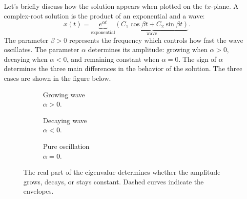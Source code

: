\documentclass[10pt,letterpaper]{article}
\begin{document}
Let's briefly discuss how the solution appears when plotted on the $tx$-plane.
A complex-root solution is the product of an exponential and a wave:
\[
x(t)=
\underbrace{e^{\alpha t}}_{\text{exponential}}
\underbrace{(C_1\cos\beta t+C_2\sin\beta t)}_{\text{wave}}.
\]
The parameter $\beta>0$ represents the frequency which controls how fast the wave oscillates.
The parameter $\alpha$ determines its amplitude: growing when
$\alpha>0$, decaying when $\alpha<0$, and remaining constant when $\alpha=0$. The sign of $\alpha$ determines the three main differences in the behavior of the solution. The three cases are shown in the figure below.

\begin{figure}[H]
\centering

\begin{subfigure}[t]{0.32\textwidth}
\centering
{}
\caption{Growing wave\\$\alpha>0$.}
\end{subfigure}
\hfill
\begin{subfigure}[t]{0.32\textwidth}
\centering
{}
\caption{Decaying wave\\$\alpha<0$.}
\end{subfigure}
\hfill
\begin{subfigure}[t]{0.32\textwidth}
\centering
{}
\caption{Pure oscillation\\$\alpha=0$.}
\end{subfigure}

\caption{The real part of the eigenvalue determines whether
the amplitude grows, decays, or stays constant.
Dashed curves indicate the envelopes.}
\end{figure}
\end{document}
